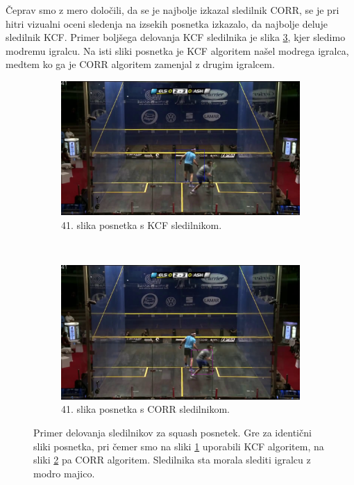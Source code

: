 Čeprav smo z mero določili, da se je najbolje izkazal sledilnik CORR, se je pri hitri vizualni oceni sledenja na izsekih posnetka \cite{squashtv2014squash} izkazalo, da najbolje deluje sledilnik KCF. Primer boljšega delovanja KCF sledilnika je slika \ref{fig:squash-tracker-visual}, kjer sledimo modremu igralcu. Na isti sliki posnetka je KCF algoritem našel modrega igralca, medtem ko ga je CORR algoritem zamenjal z drugim igralcem. 



\begin{figure}[!htbp]
	\centering
	
	\begin{subfigure}[t]{0.45\columnwidth}
		\includegraphics[width=\columnwidth]{./Slike/squash-1-kcf-example.png}
		\caption{41. slika posnetka \cite{squashtv2014squash} s KCF sledilnikom.}
		\label{fig:squash-1-kcf}
	\end{subfigure}
	~
	\begin{subfigure}[t]{0.45\columnwidth}
		\includegraphics[width=\columnwidth]{./Slike/squash-1-corr-example.png}
		\caption{41. slika posnetka \cite{squashtv2014squash} s CORR sledilnikom.}
		\label{fig:squash-1-corr}
	\end{subfigure}  
	\caption[Primer delovanja sledilnikov za squash posnetek]{Primer delovanja sledilnikov za squash posnetek. Gre za identični sliki posnetka, pri čemer smo na sliki \ref{fig:squash-1-kcf} uporabili KCF algoritem, na sliki \ref{fig:squash-1-corr} pa CORR algoritem. Sledilnika sta morala slediti igralcu z modro majico.}
	\label{fig:squash-tracker-visual}
\end{figure}


